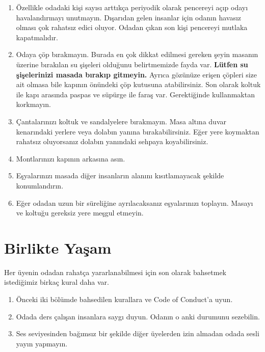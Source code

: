 \documentclass{article}
\begin{document}
\begin{enumerate}
	\item Özellikle odadaki kişi sayısı arttıkça periyodik olarak pencereyi
		açıp odayı havalandırmayı unutmayın. Dışarıdan gelen insanlar
		için odanın havasız olması çok rahatsız edici oluyor. Odadan
		çıkan son kişi pencereyi mutlaka kapatmalıdır.
	\item Odaya çöp bırakmayın. Burada en çok dikkat edilmesi gereken şeyin
		masanın üzerine bırakılan su şişeleri olduğunu belirtmemizde
		fayda var. \textbf{Lütfen su şişelerinizi masada bırakıp
		gitmeyin.} Ayrıca gözünüze erişen çöpleri size ait olmasa bile
		kapının önündeki çöp kutusuna atabilirsiniz. Son olarak koltuk
		ile kapı arasında paspas ve süpürge ile faraş var. Gerektiğinde
		kullanmaktan korkmayın.
	\item Çantalarınızı koltuk ve sandalyelere bırakmayın. Masa altına
		duvar kenarındaki yerlere veya dolabın yanına bırakabilirsiniz.
		Eğer yere koymaktan rahatsız oluyorsanız dolabın yanındaki
		sehpaya koyabilirsiniz.
	\item Montlarınızı kapının arkasına asın.
	\item Eşyalarınızı masada diğer insanların alanını kısıtlamayacak
		şekilde konumlandırın.
	\item Eğer odadan uzun bir süreliğine ayrılacaksanız eşyalarınızı
		toplayın. Masayı ve koltuğu gereksiz yere meşgul etmeyin.
\end{enumerate}

\section{Birlikte Yaşam}
Her üyenin odadan rahatça yararlanabilmesi için son olarak bahsetmek
istediğimiz birkaç kural daha var.
\begin{enumerate}
	\item Önceki iki bölümde bahsedilen kurallara ve Code of Conduct'a
		uyun.
	\item Odada ders çalışan insanlara saygı duyun. Odanın o anki durumunu
		sezebilin.
	\item Ses seviyesinden bağımsız bir şekilde diğer üyelerden izin
		almadan odada sesli yayın yapmayın.
\end{enumerate}
	
\end{document}
